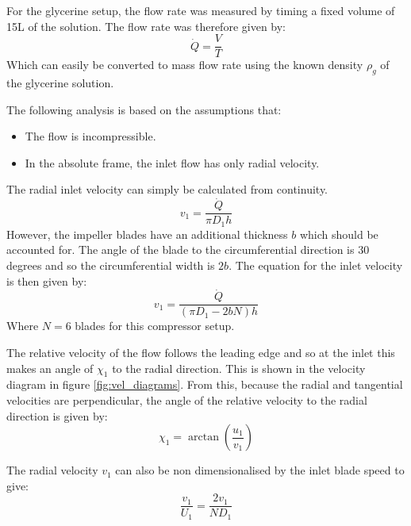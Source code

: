 \documentclass{article}
\begin{document}
For the glycerine setup, the flow rate was measured by timing a fixed volume of 15L of the solution.
The flow rate was therefore given by:
\begin{equation}
    \dot{Q} = \frac{V}{T}
\end{equation}
Which can easily be converted to mass flow rate using the known density $\rho_g$ of the glycerine solution.


The following analysis is based on the assumptions that:
\begin{itemize}
    \item The flow is incompressible.
    \item In the absolute frame, the inlet flow has only radial velocity.
\end{itemize} 

The radial inlet velocity can simply be calculated from continuity.
\begin{equation}
    v_1 = \frac{\dot{Q}}{\pi D_1 h} \label{eq:simple_radial_velocity}
\end{equation}
However, the impeller blades have an additional thickness $b$ which should be accounted for.
The angle of the blade to the circumferential direction is 30 degrees and so the circumferential width is $2b$.
The equation for the inlet velocity is then given by:
\begin{equation}
    v_1 = \frac{\dot{Q}}{(\pi D_1 - 2b N) h} \label{eq:radial_velocity}
\end{equation}
Where $N = 6$ blades for this compressor setup.

The relative velocity of the flow follows the leading edge and so at the inlet this makes an angle of $\chi_1$ to the radial direction.
This is shown in the velocity diagram in figure \ref{fig:vel_diagrams}.
From this, because the radial and tangential velocities are perpendicular,
the angle of the relative velocity to the radial direction is given by:
\begin{equation}
    \chi_1 = \arctan\left( \frac{u_1}{v_1} \right)
\end{equation}

The radial velocity $v_1$ can also be non dimensionalised by the inlet blade speed to give:
\begin{equation}
    \frac{v_1}{U_1} = \frac{2v_1}{N D_1}
\end{equation}
\end{document}
